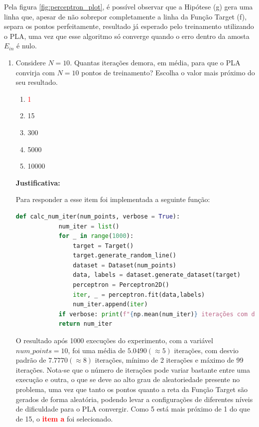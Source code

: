 Pela figura \ref{fig:perceptron_plot}, é possível observar que a Hipótese (g) gera uma linha que, apesar de não sobrepor completamente a linha da Função Target (f), separa os pontos perfeitamente, resultado já esperado pelo treinamento utilizando o PLA, uma vez que esse algoritmo só converge quando o erro dentro da amosta $E_{in}$ é nulo.  

\begin{enumerate}
    \item Considere $N = 10$. Quantas iterações demora, em média, para que o PLA convirja com $N = 10$
    pontos de treinamento? Escolha o valor mais próximo do seu resultado.

    \begin{enumerate}
        \item[\textcolor{red}{(a)}]\textcolor{red}{1}\addtocounter{enumii}{1}
        \item 15
        \item 300
        \item 5000
        \item 10000
    \end{enumerate}
     
    \par

    \textbf{Justificativa:}

    Para responder a esse item foi implementada a seguinte função:

    \begin{lstlisting}[language=Python, caption=Cálculo do número de iterações, label=cod:perceptron_num_iter]
        def calc_num_iter(num_points, verbose = True):
            num_iter = list()
            for _ in range(1000):
                target = Target()
                target.generate_random_line()
                dataset = Dataset(num_points)
                data, labels = dataset.generate_dataset(target)
                perceptron = Perceptron2D()
                iter, _ = perceptron.fit(data,labels)
                num_iter.append(iter)
            if verbose: print(f"{np.mean(num_iter)} iterações com desvio padrão {np.std(num_iter):.4f} (min:{np.min(num_iter)}, máx:{np.max(num_iter)})")
            return num_iter
    \end{lstlisting}

    O resultado após 1000 execuções do experimento, com a variável $num\_points = 10$, foi uma média de $5.0490(\approx 5)$ iterações, com desvio padrão de $7.7770(\approx 8)$ iterações, mínimo de 2 iterações e máximo de 99 iterações. Nota-se que o número de iterações pode variar bastante entre uma execução e outra, o que se deve ao alto grau de aleatoriedade presente no problema, uma vez que tanto os pontos quanto a reta da Função Target são gerados de forma aleatória, podendo levar a configurações de diferentes níveis de dificuldade para o PLA convergir. 
     Como 5 está mais próximo de 1 do que de 15, o \textcolor{red}{\textbf{item a}} foi selecionado. 
    

\end{enumerate}
